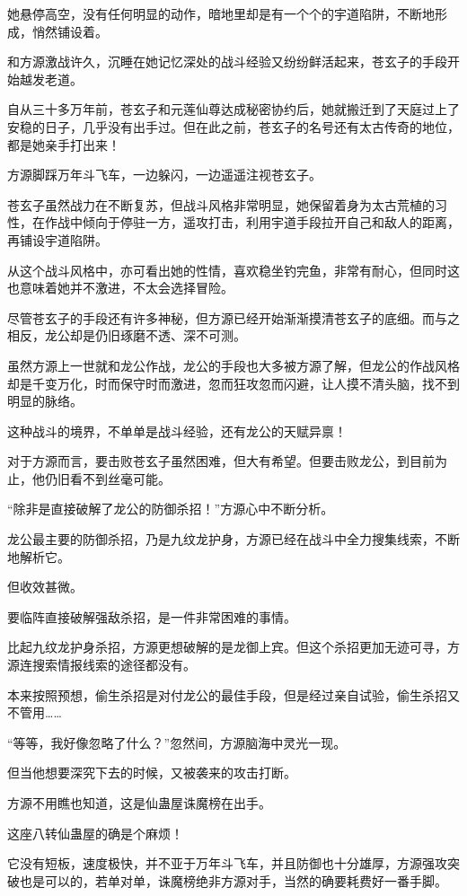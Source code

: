 \begin{this_body}
她悬停高空，没有任何明显的动作，暗地里却是有一个个的宇道陷阱，不断地形成，悄然铺设着。

和方源激战许久，沉睡在她记忆深处的战斗经验又纷纷鲜活起来，苍玄子的手段开始越发老道。

自从三十多万年前，苍玄子和元莲仙尊达成秘密协约后，她就搬迁到了天庭过上了安稳的日子，几乎没有出手过。但在此之前，苍玄子的名号还有太古传奇的地位，都是她亲手打出来！

方源脚踩万年斗飞车，一边躲闪，一边遥遥注视苍玄子。

苍玄子虽然战力在不断复苏，但战斗风格非常明显，她保留着身为太古荒植的习性，在作战中倾向于停驻一方，遥攻打击，利用宇道手段拉开自己和敌人的距离，再铺设宇道陷阱。

从这个战斗风格中，亦可看出她的性情，喜欢稳坐钓完鱼，非常有耐心，但同时这也意味着她并不激进，不太会选择冒险。

尽管苍玄子的手段还有许多神秘，但方源已经开始渐渐摸清苍玄子的底细。而与之相反，龙公却是仍旧琢磨不透、深不可测。

虽然方源上一世就和龙公作战，龙公的手段也大多被方源了解，但龙公的作战风格却是千变万化，时而保守时而激进，忽而狂攻忽而闪避，让人摸不清头脑，找不到明显的脉络。

这种战斗的境界，不单单是战斗经验，还有龙公的天赋异禀！

对于方源而言，要击败苍玄子虽然困难，但大有希望。但要击败龙公，到目前为止，他仍旧看不到丝毫可能。

“除非是直接破解了龙公的防御杀招！”方源心中不断分析。

龙公最主要的防御杀招，乃是九纹龙护身，方源已经在战斗中全力搜集线索，不断地解析它。

但收效甚微。

要临阵直接破解强敌杀招，是一件非常困难的事情。

比起九纹龙护身杀招，方源更想破解的是龙御上宾。但这个杀招更加无迹可寻，方源连搜索情报线索的途径都没有。

本来按照预想，偷生杀招是对付龙公的最佳手段，但是经过亲自试验，偷生杀招又不管用……

“等等，我好像忽略了什么？”忽然间，方源脑海中灵光一现。

但当他想要深究下去的时候，又被袭来的攻击打断。

方源不用瞧也知道，这是仙蛊屋诛魔榜在出手。

这座八转仙蛊屋的确是个麻烦！

它没有短板，速度极快，并不亚于万年斗飞车，并且防御也十分雄厚，方源强攻突破也是可以的，若单对单，诛魔榜绝非方源对手，当然的确要耗费好一番手脚。


\end{this_body}
